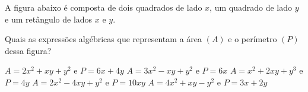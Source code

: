 A figura abaixo é composta de dois quadrados de lado $x$, um quadrado de lado $y$ e um retângulo de lados $x$ e $y$.
\begin{center}
	\vspace{-3mm}
	\vspace{-3mm}
\end{center}
Quais as expressões algébricas que representam a área $(A)$ e o perímetro $(P)$ dessa figura?

$A=2x^2+xy+y^2$ e $P=6x+4y$
$A=3x^2-xy+y^2$ e $P=6x$
$A=x^2+2xy+y^3$ e $P=4y$
$A=2x^2-4xy+y^2$ e $P=10xy$
$A=4x^2+xy-y^2$ e $P=3x+2y$



